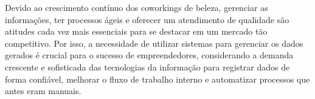 Devido ao crescimento contínuo dos coworkings de beleza, gerenciar as informações, ter processos ágeis e oferecer um atendimento de qualidade são atitudes cada vez mais essenciais para se destacar em um mercado tão competitivo. Por isso, a necessidade de utilizar sistemas para gerenciar os dados gerados é crucial para o sucesso de empreendedores, considerando  a demanda crescente e sofisticada das tecnologias da informação para registrar dados de forma confiável, melhorar o fluxo de trabalho interno e automatizar processos que antes eram manuais.



	

%
